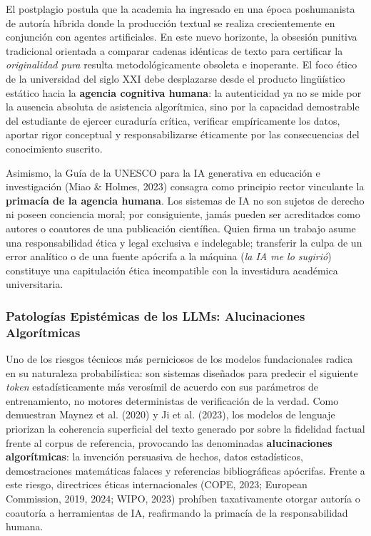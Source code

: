 El postplagio postula que la academia ha ingresado en una época poshumanista de autoría híbrida donde la producción textual se realiza crecientemente en conjunción con agentes artificiales. En este nuevo horizonte, la obsesión punitiva tradicional orientada a comparar cadenas idénticas de texto para certificar la \textsl{\guillemotleft originalidad pura\guillemotright} resulta metodológicamente obsoleta e inoperante. El foco ético de la universidad del siglo XXI debe desplazarse desde el producto lingüístico estático hacia la \textbf{agencia cognitiva humana}: la autenticidad ya no se mide por la ausencia absoluta de asistencia algorítmica, sino por la capacidad demostrable del estudiante de ejercer curaduría crítica, verificar empíricamente los datos, aportar rigor conceptual y responsabilizarse éticamente por las consecuencias del conocimiento suscrito.

Asimismo, la Guía de la UNESCO para la IA generativa en educación e investigación (Miao \& Holmes, 2023) consagra como principio rector vinculante la \textbf{primacía de la agencia humana}. Los sistemas de IA no son sujetos de derecho ni poseen conciencia moral; por consiguiente, jamás pueden ser acreditados como autores o coautores de una publicación científica. Quien firma un trabajo asume una responsabilidad ética y legal exclusiva e indelegable; transferir la culpa de un error analítico o de una fuente apócrifa a la máquina (\textsl{\guillemotleft la IA me lo sugirió\guillemotright}) constituye una capitulación ética incompatible con la investidura académica universitaria.

\subsubsection{Patologías Epistémicas de los LLMs: Alucinaciones Algorítmicas}

Uno de los riesgos técnicos más perniciosos de los modelos fundacionales radica en su naturaleza probabilística: son sistemas diseñados para predecir el siguiente \textit{token} estadísticamente más verosímil de acuerdo con sus parámetros de entrenamiento, no motores deterministas de verificación de la verdad. Como demuestran Maynez et al. (2020) y Ji et al. (2023), los modelos de lenguaje priorizan la coherencia superficial del texto generado por sobre la fidelidad factual frente al corpus de referencia, provocando las denominadas \textbf{alucinaciones algorítmicas}: la invención persuasiva de hechos, datos estadísticos, demostraciones matemáticas falaces y referencias bibliográficas apócrifas. Frente a este riesgo, directrices éticas internacionales (COPE, 2023; European Commission, 2019, 2024; WIPO, 2023) prohíben taxativamente otorgar autoría o coautoría a herramientas de IA, reafirmando la primacía de la responsabilidad humana.

